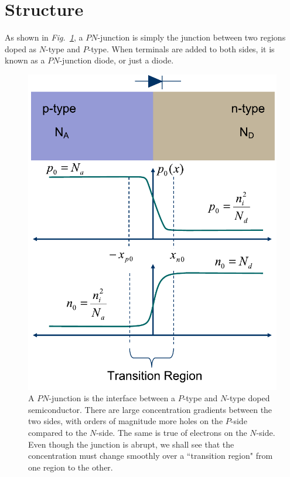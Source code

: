 \section{Structure}
As shown in \emph{Fig.~\ref{fig:slide2}}, a $PN$-junction is simply the junction between two regions doped as $N$-type and $P$-type.  When terminals are added to both sides, it is known as a $PN$-junction diode, or just a diode.
\begin{figure}[tb]
\centering
\includegraphics[width=.5\columnwidth]{slide2}
\caption{A $PN$-junction is the interface between a $P$-type and $N$-type doped semiconductor.  There are large concentration gradients between the two sides, with orders of magnitude more holes on the $P$-side compared to the $N$-side.  The same is true of electrons on the $N$-side.  Even though the junction is abrupt, we shall see that the concentration must change smoothly over a ``transition region" from one region to the other.}
\label{fig:slide2}
\end{figure}
